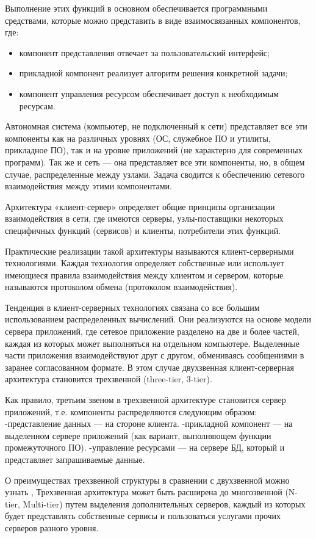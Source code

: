 \documentclass[oneside,final,14pt]{extreport}
\begin{document}
Выполнение этих функций в основном обеспечивается программными средствами, которые можно представить в виде взаимосвязанных компонентов, где:
\begin{itemize}
\item компонент представления отвечает за пользовательский интерфейс;
\item прикладной компонент реализует алгоритм решения конкретной задачи;
\item компонент управления ресурсом обеспечивает доступ к необходимым ресурсам.
\end{itemize}

Автономная система (компьютер, не подключенный к сети) представляет все эти компоненты как на различных уровнях (ОС, служебное ПО и утилиты, прикладное ПО), так и на уровне приложений (не характерно для современных программ). Так же и сеть — она представляет все эти компоненты, но, в общем случае, распределенные между узлами. Задача сводится к обеспечению сетевого взаимодействия между этими компонентами.

Архитектура «клиент-сервер» определяет общие принципы организации взаимодействия в сети, где имеются серверы, узлы-поставщики некоторых специфичных функций (сервисов) и клиенты, потребители этих функций.

Практические реализации такой архитектуры называются клиент-серверными технологиями. Каждая технология определяет собственные или использует имеющиеся правила взаимодействия между клиентом и сервером, которые называются протоколом обмена (протоколом взаимодействия).

Тенденция в клиент-серверных технологиях связана со все большим использованием распределенных вычислений. Они реализуются на основе модели сервера приложений, где сетевое приложение разделено на две и более частей, каждая из которых может выполняться на отдельном компьютере. Выделенные части приложения взаимодействуют друг с другом, обмениваясь сообщениями в заранее согласованном формате. В этом случае двухзвенная клиент-серверная архитектура становится трехзвенной (three-tier, 3-tier).

Как правило, третьим звеном в трехзвенной архитектуре становится сервер приложений, т.е. компоненты распределяются следующим образом:
-представление данных — на стороне клиента.
-прикладной компонент — на выделенном сервере приложений (как вариант, выполняющем функции промежуточного ПО).
-управление ресурсами — на сервере БД, который и представляет запрашиваемые данные.

О преимуществах трехзвенной структуры в сравнении с двухзвенной можно узнать \cite{bib:habr},
Трехзвенная архитектура может быть расширена до многозвенной (N-tier, Multi-tier) путем выделения дополнительных серверов, каждый из которых будет представлять собственные сервисы и пользоваться услугами прочих серверов разного уровня\cite{bib:meth}.
\end{document}
